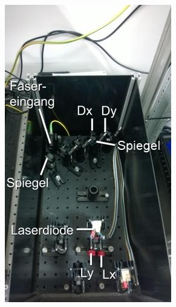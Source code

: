 \begin{figure}
\begin{subfigure}[b]{0.5\linewidth}
\includegraphics[width=0.98\linewidth]{IMAGE/einkopplung.jpeg}
\label{fig:einkopplung}


\end{subfigure}
\end{figure}
